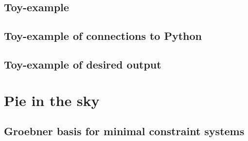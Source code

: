 \subsection{Toy-example}                                                                            \label{formal: toy}
\subsection{Toy-example of connections to Python}                                                \label{formal: python}
\subsection{Toy-example of desired output}                                                       \label{formal: output}

\section{Pie in the sky}
\subsection{Groebner basis for minimal constraint systems}                                     \label{formal: groebner}
